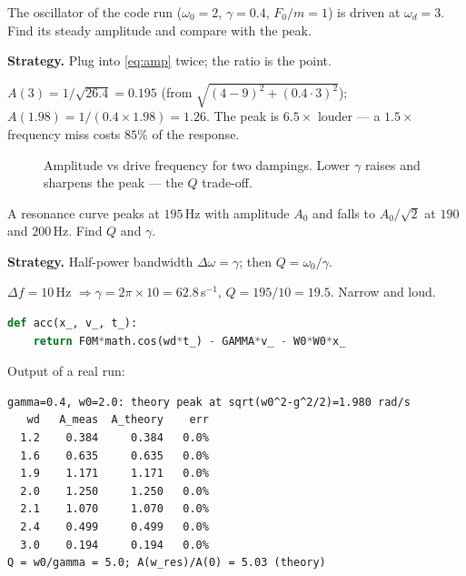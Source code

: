 \begin{example}\label{ex:offres}
The oscillator of the code run ($\omega_0=2$, $\gamma=0.4$, $F_0/m=1$)
is driven at $\omega_d=3$. Find its steady amplitude and compare with
the peak.
\par\smallskip
\textbf{Strategy.} Plug into \eqref{eq:amp} twice; the ratio is the
point.
\begin{solution}
$A(3)=1/\sqrt{26.4}=0.195$ (from
$\sqrt{(4-9)^{2}+(0.4\cdot3)^{2}}$);
$A(1.98)=1/(0.4\times1.98)=1.26$.
The peak is $6.5\times$ louder --- a $1.5\times$ frequency miss costs
$85\%$ of the response. \checkmark
\end{solution}
\end{example}

\begin{figure}[htbp]\centering

\caption{Amplitude vs drive frequency for two dampings. Lower $\gamma$
raises and sharpens the peak --- the $Q$ trade-off.}
\label{fig:resonance}
\end{figure}

\begin{example}\label{ex:qfactor}
A resonance curve peaks at $195$\,Hz with amplitude $A_0$ and falls to
$A_0/\sqrt{2}$ at $190$ and $200$\,Hz. Find $Q$ and $\gamma$.
\par\smallskip
\textbf{Strategy.} Half-power bandwidth $\Delta\omega=\gamma$; then
$Q=\omega_0/\gamma$.
\begin{solution}
$\Delta f=10$\,Hz $\Rightarrow \gamma=2\pi\times10=62.8$\,s$^{-1}$,
$Q=195/10=19.5$. Narrow and loud. \checkmark
\end{solution}
\end{example}

\begin{lstlisting}[language=Python,caption={\texttt{code/ch07\_resonance\_sweep.py} --- RK4 driven oscillator, amplitude vs theory.},label={lst:sweep}]
def acc(x_, v_, t_):
    return F0M*math.cos(wd*t_) - GAMMA*v_ - W0*W0*x_
\end{lstlisting}

Output of a real run:
\begin{lstlisting}[numbers=none]
gamma=0.4, w0=2.0: theory peak at sqrt(w0^2-g^2/2)=1.980 rad/s
   wd   A_meas  A_theory    err
  1.2    0.384     0.384   0.0%
  1.6    0.635     0.635   0.0%
  1.9    1.171     1.171   0.0%
  2.0    1.250     1.250   0.0%
  2.1    1.070     1.070   0.0%
  2.4    0.499     0.499   0.0%
  3.0    0.194     0.194   0.0%
Q = w0/gamma = 5.0; A(w_res)/A(0) = 5.03 (theory)
\end{lstlisting}

